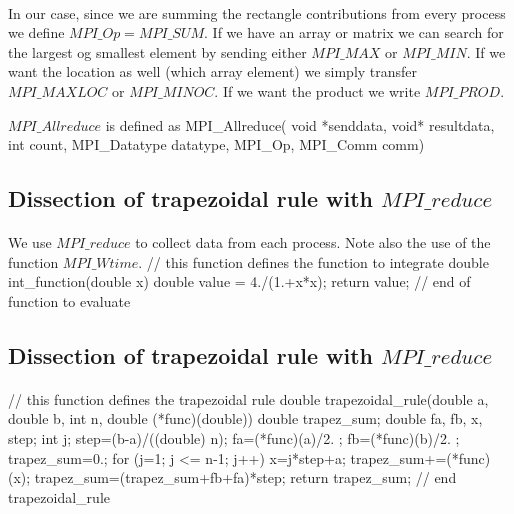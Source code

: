 \documentclass[%
twoside,                 %
final,                   %
10pt]{article}
\begin{document}
{%
\paragraph{}
In our case, since we are summing
the rectangle  contributions from every process we define  $MPI\_Op = MPI\_SUM$.
If we have an array or matrix we can search for the largest og smallest element by sending either $MPI\_MAX$ or 
$MPI\_MIN$.  If we want the location as well (which array element) we simply transfer 
$MPI\_MAXLOC$ or $MPI\_MINOC$. If we want the product we write $MPI\_PROD$. 

$MPI\_Allreduce$ is defined as
\bcppcod
MPI_Allreduce( void *senddata, void* resultdata, int count, 
          MPI_Datatype datatype, MPI_Op, MPI_Comm comm)        
\ecppcod



\subsection{Dissection of trapezoidal rule with $MPI\_reduce$}

\paragraph{}

We use $MPI\_reduce$ to collect data from each process. Note also the use of the function 
$MPI\_Wtime$. 
\bcppcod
//  this function defines the function to integrate
double int_function(double x)
{
  double value = 4./(1.+x*x);
  return value;
} // end of function to evaluate

\ecppcod



\subsection{Dissection of trapezoidal rule with $MPI\_reduce$}

\paragraph{}
\bcppcod
//  this function defines the trapezoidal rule
double trapezoidal_rule(double a, double b, int n, 
                         double (*func)(double))
{
  double trapez_sum;
  double fa, fb, x, step;
  int    j;
  step=(b-a)/((double) n);
  fa=(*func)(a)/2. ;
  fb=(*func)(b)/2. ;
  trapez_sum=0.;
  for (j=1; j <= n-1; j++){
    x=j*step+a;
    trapez_sum+=(*func)(x);
  }
  trapez_sum=(trapez_sum+fb+fa)*step;
  return trapez_sum;
}  // end trapezoidal_rule 
\ecppcod



}
\end{document}
